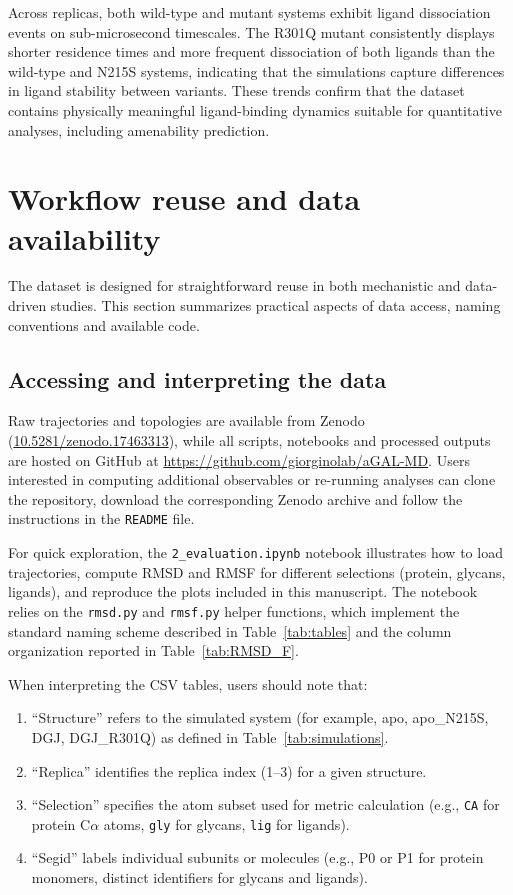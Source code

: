 \documentclass{article}
\begin{document}
Across replicas, both wild-type and mutant systems exhibit ligand dissociation events on sub-microsecond timescales.
The R301Q mutant consistently displays shorter residence times and more frequent dissociation of both ligands than the wild-type and N215S systems, indicating that the simulations capture differences in ligand stability between variants.
These trends confirm that the dataset contains physically meaningful ligand-binding dynamics suitable for quantitative analyses, including amenability prediction.

\section{Workflow reuse and data availability}

The dataset is designed for straightforward reuse in both mechanistic and data-driven studies.
This section summarizes practical aspects of data access, naming conventions and available code.

\subsection{Accessing and interpreting the data}

Raw trajectories and topologies are available from Zenodo (\url{10.5281/zenodo.17463313}), while all scripts, notebooks and processed outputs are hosted on GitHub at \url{https://github.com/giorginolab/aGAL-MD}.
Users interested in computing additional observables or re-running analyses can clone the repository, download the corresponding Zenodo archive and follow the instructions in the \verb+README+ file.

For quick exploration, the \verb+2_evaluation.ipynb+ notebook illustrates how to load trajectories, compute RMSD and RMSF for different selections (protein, glycans, ligands), and reproduce the plots included in this manuscript.
The notebook relies on the \verb|rmsd.py| and \verb|rmsf.py| helper functions, which implement the standard naming scheme described in Table~\ref{tab:tables} and the column organization reported in Table~\ref{tab:RMSD_F}.

When interpreting the CSV tables, users should note that:
\begin{enumerate}
    \item ``Structure'' refers to the simulated system (for example, apo, apo\_N215S, DGJ, DGJ\_R301Q) as defined in Table~\ref{tab:simulations}.
    \item ``Replica'' identifies the replica index (1--3) for a given structure.
    \item ``Selection'' specifies the atom subset used for metric calculation (e.g., \texttt{CA} for protein C$\alpha$ atoms, \texttt{gly} for glycans, \texttt{lig} for ligands).
    \item ``Segid'' labels individual subunits or molecules (e.g., P0 or P1 for protein monomers, distinct identifiers for glycans and ligands).
\end{enumerate}
\end{document}

